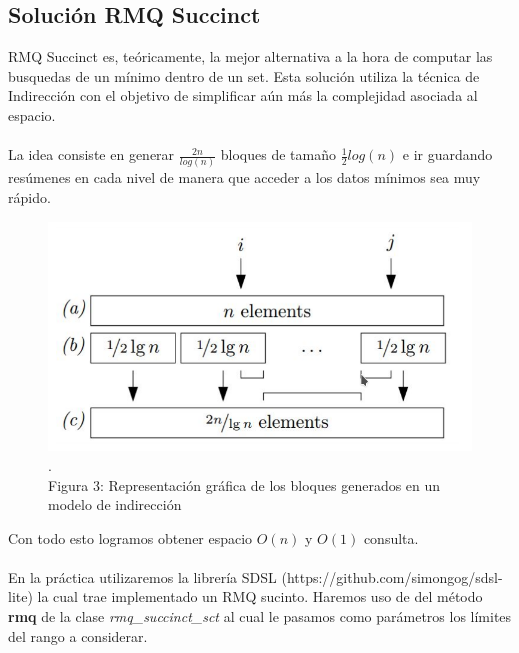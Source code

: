 \documentclass[11pt]{article}
\begin{document}
\subsection{Solución RMQ Succinct}
RMQ Succinct es, teóricamente, la mejor alternativa a la hora de computar las busquedas de un mínimo dentro de un set. Esta solución utiliza la técnica de Indirección con el objetivo de simplificar aún más la complejidad asociada al espacio.\\\\La idea consiste en generar $\frac{2n}{log(n)}$ bloques de tamaño $\frac{1}{2}log(n)$ e ir guardando resúmenes en cada nivel de manera que acceder a los datos mínimos sea muy rápido.  
\begin{figure}[htp]
\centering
\includegraphics[scale=0.5]{indirecion.png}
\\\scriptsize{\color{white}.\color{black}\\Figura 3: Representación gráfica de los bloques generados en un modelo de indirección}
\label{}
\end{figure}
Con todo esto logramos obtener espacio $O(n)$ y $O(1)$ consulta.\\\\En la práctica utilizaremos la librería SDSL (https://github.com/simongog/sdsl-lite) la cual trae implementado un RMQ sucinto. Haremos uso de del método \textbf{rmq} de la clase \emph{rmq\_succinct\_sct} al cual le pasamos como parámetros los límites del rango a considerar.
\end{document}
